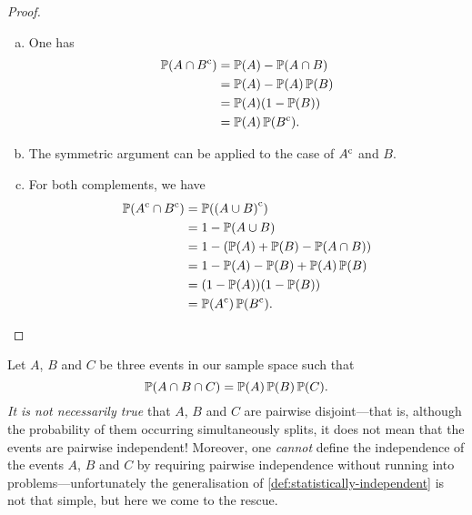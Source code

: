\begin{proof}
    \begin{enumerate}[(a)]\setlength\itemsep{0em}
        \item One has
              \begin{align*}
                  \operatorname{\mathbb{P}}(A \cap {B}^{\text{c}})
                   & = \operatorname{\mathbb{P}}(A) - \operatorname{\mathbb{P}}(A \cap B)   \\
                   & = \operatorname{\mathbb{P}}(A) - \operatorname{\mathbb{P}}(A) \operatorname{\mathbb{P}}(B) \\
                   & = \operatorname{\mathbb{P}}(A) (1 - \operatorname{\mathbb{P}}(B))      \\
                   & = \operatorname{\mathbb{P}}(A) \operatorname{\mathbb{P}}({B}^{\text{c}}).
              \end{align*}
        \item The symmetric argument can be applied to the case of \({A}^{\text{c}}\) and \(B\).

        \item For both complements, we have
              \begin{align*}
                  \operatorname{\mathbb{P}}({A}^{\text{c}} \cap {B}^{\text{c}})
                   & = \operatorname{\mathbb{P}}({(A \cup B)}^{\text{c}})                   \\
                   & = 1 - \operatorname{\mathbb{P}}(A \cup B)                         \\
                   & = 1 - (\operatorname{\mathbb{P}}(A) + \operatorname{\mathbb{P}}(B) - \operatorname{\mathbb{P}}(A \cap B)) \\
                   & = 1 - \operatorname{\mathbb{P}}(A) - \operatorname{\mathbb{P}}(B) + \operatorname{\mathbb{P}}(A) \operatorname{\mathbb{P}}(B) \\
                   & = (1 - \operatorname{\mathbb{P}}(A)) (1 - \operatorname{\mathbb{P}}(B))               \\
                   & = \operatorname{\mathbb{P}}({A}^{\text{c}}) \operatorname{\mathbb{P}}({B}^{\text{c}}).
              \end{align*}
    \end{enumerate}
\end{proof}

\begin{remark}
    \label{rem:event-independence}
    Let \(A\), \(B\) and \(C\) be three events in our sample space such that
    \[
        \operatorname{\mathbb{P}}(A \cap B \cap C) = \operatorname{\mathbb{P}}(A) \operatorname{\mathbb{P}}(B) \operatorname{\mathbb{P}}(C).
    \]
    \emph{It is not necessarily true} that \(A\), \(B\) and \(C\) are pairwise
    disjoint---that is, although the probability of them occurring simultaneously
    splits, it does not mean that the events are pairwise independent! Moreover, one
    \emph{cannot} define the independence of the events \(A\), \(B\) and \(C\) by
    requiring pairwise independence without running into problems---unfortunately
    the generalisation of \cref{def:statistically-independent} is not that simple,
    but here we come to the rescue.
\end{remark}

